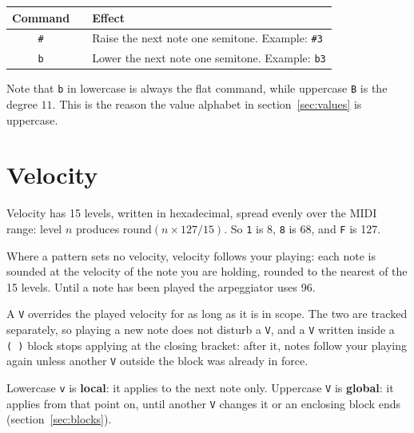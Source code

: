 \documentclass[11pt,a4paper]{article}
\newcommand{\pat}[1]{\texttt{#1}}
\begin{document}
\begin{center}
\begin{tabular}{@{}clp{85mm}@{}}
\toprule
\textbf{Command} & & \textbf{Effect}\\
\midrule
\pat{\#} & & Raise the next note one semitone. Example: \pat{\#3}\\
\pat{b}  & & Lower the next note one semitone. Example: \pat{b3}\\
\bottomrule
\end{tabular}
\end{center}

Note that \pat{b} in lowercase is always the flat command, while uppercase
\pat{B} is the degree $11$. This is the reason the value alphabet in
section~\ref{sec:values} is uppercase.

\section{Velocity}

Velocity has 15 levels, written in hexadecimal, spread evenly over the MIDI
range: level $n$ produces $\mathrm{round}(n \times 127/15)$. So \pat{1} is 8,
\pat{8} is 68, and \pat{F} is 127.

Where a pattern sets no velocity, velocity follows your playing: each note is
sounded at the velocity of the note you are holding, rounded to the nearest of
the 15 levels. Until a note has been played the arpeggiator uses 96.

A \pat{V} overrides the played velocity for as long as it is in scope. The two
are tracked separately, so playing a new note does not disturb a \pat{V}, and a
\pat{V} written inside a \pat{(\ )} block stops applying at the closing bracket:
after it, notes follow your playing again unless another \pat{V} outside the
block was already in force.

Lowercase \pat{v} is \textbf{local}: it applies to the next note only.
Uppercase \pat{V} is \textbf{global}: it applies from that point on, until
another \pat{V} changes it or an enclosing block ends
(section~\ref{sec:blocks}).
\end{document}
